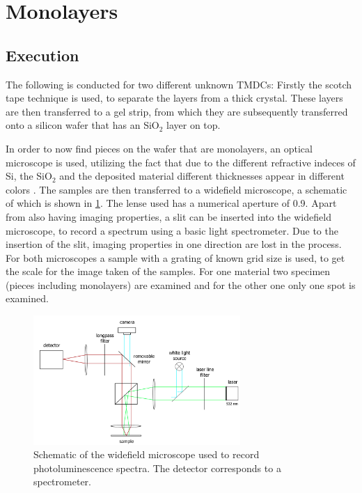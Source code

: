 \section{Monolayers}
\label{sec:mono}

\subsection{Execution}

The following is conducted for two different unknown TMDCs:
Firstly the scotch tape technique is used, to separate the layers from a thick crystal.
These layers are then transferred to a gel strip, from which they are subsequently transferred onto a silicon wafer that has an SiO$_2$ layer on top.

In order to now find pieces on the wafer that are monolayers, an optical microscope is used, utilizing the fact that due to the different refractive indeces of Si, the SiO$_2$ and the deposited material different thicknesses appear in different colors \cite{benameur2011}.
The samples are then transferred to a widefield microscope, a schematic of which is shown in \cref{fig_widefield}.
The lense used has a numerical aperture of \SI{0.9}{}.
Apart from also having imaging properties, a slit can be inserted into the widefield microscope, to record a spectrum using a basic light spectrometer.
Due to the insertion of the slit, imaging properties in one direction are lost in the process.
For both microscopes a sample with a grating of known grid size is used, to get the scale for the image taken of the samples.
For one material two specimen (pieces including monolayers) are examined and for the other one only one spot is examined.

\begin{figure}[!ht]
    \centering
    \includegraphics[width=0.7\textwidth]{img/setup1.png}
    \caption{Schematic of the widefield microscope used to record photoluminescence spectra. The detector corresponds to a spectrometer.}
    \label{fig_widefield}
\end{figure}


